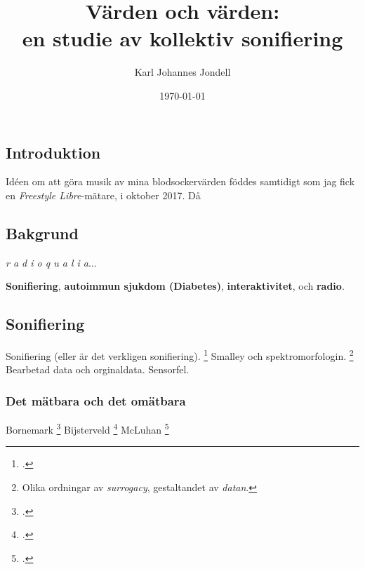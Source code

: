 \documentclass[11pt, twoside, a4paper]{article}
\title{Värden och värden:\\
	\large en studie av kollektiv sonifiering
}
\author{Karl Johannes Jondell}
\date{\today}
\begin{document}



\tableofcontents
\clearpage

\newpage
\begin{multicols}{2}

\section*{Introduktion}

Idéen om att göra musik av mina blodsockervärden föddes samtidigt som jag fick en \emph{Freestyle Libre}-mätare, i oktober 2017. Då 

\subsection*{Bakgrund}
\emph{r a d i o q u a l i a}...

\textbf{Sonifiering}, \textbf{autoimmun sjukdom (Diabetes)}, \textbf{interaktivitet}, och \textbf{radio}.


\subsection*{Sonifiering}
Sonifiering (eller är det verkligen sonifiering). \footcite[2]{bijsterveld_sonic_2019}
Smalley och spektromorfologin. \footnote{Olika ordningar av \emph{surrogacy},  gestaltandet av \emph{datan}.} Bearbetad data och orginaldata. Sensorfel.

\subsubsection*{Det mätbara och det omätbara}
Bornemark \footcite{bornemark_det_2018}
Bijsterveld \footcite[100-102]{bijsterveld_sonic_2019}
McLuhan \footcite[2]{mcluhan_understanding_2015}


\end{multicols}
\end{document}

